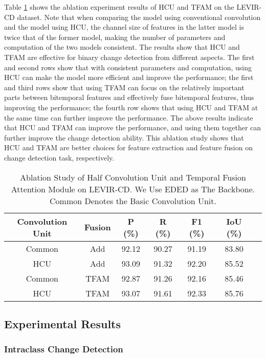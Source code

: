 \documentclass[journal]{IEEEtran}
\begin{document}
Table \ref{module_ablation} shows the ablation experiment results of HCU and TFAM on the LEVIR-CD dataset. Note that when comparing the model using conventional convolution and the model using HCU, the channel size of features in the latter model is twice that of the former model, making the number of parameters and computation of the two models consistent. The results show that HCU and TFAM are effective for binary change detection from different aspects. The first and second rows show that with consistent parameters and computation, using HCU can make the model more efficient and improve the performance; the first and third rows show that using TFAM can focus on the relatively important parts between bitemporal features and effectively fuse bitemporal features, thus improving the performance; the fourth row shows that using HCU and TFAM at the same time can further improve the performance. The above results indicate that HCU and TFAM can improve the performance, and using them together can further improve the change detection ability. This ablation study shows that HCU and TFAM are better choices for feature extraction and feature fusion on change detection task, respectively.


\begin{table}[!ht]
\caption{Ablation Study of Half Convolution Unit and Temporal Fusion Attention Module on LEVIR-CD. We Use EDED as The Backbone. Common Denotes the Basic Convolution Unit.}
\label{module_ablation}
\centering
\begin{tabular}{ccccccc} 
\toprule
Convolution Unit & Fusion & P (\%) & R (\%) & F1 (\%) & IoU (\%) \\
\midrule
Common & Add & 92.12 & 90.27 & 91.19 & 83.80 \\
HCU & Add & 93.09 & 91.32 & 92.20 & 85.52 \\
Common & TFAM & 92.87 & 91.26 & 92.16 & 85.46 \\
HCU & TFAM & 93.07 & 91.61 & 92.33 & 85.76 \\
\bottomrule
\end{tabular}
\end{table}


\subsection{Experimental Results}

\subsubsection{Intraclass Change Detection}
\label{section:4.4.3}
\end{document}
